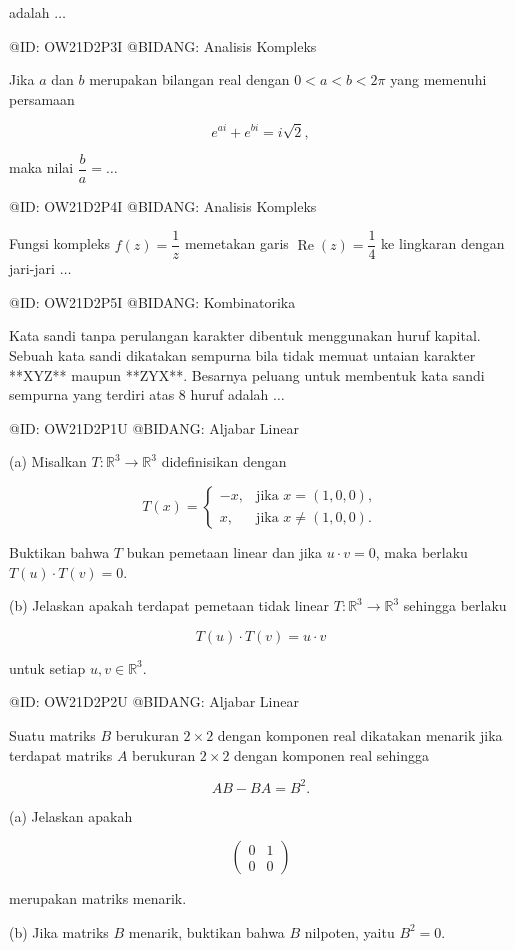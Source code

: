 adalah $\ldots$

@ID: OW21D2P3I
@BIDANG: Analisis Kompleks

Jika $a$ dan $b$ merupakan bilangan real dengan $0<a<b<2\pi$ yang memenuhi persamaan

$$
e^{ai}+e^{bi}=i\sqrt2,
$$

maka nilai $\dfrac ba=\ldots$

@ID: OW21D2P4I
@BIDANG: Analisis Kompleks

Fungsi kompleks $f(z)=\dfrac1z$ memetakan garis $\operatorname{Re}(z)=\dfrac14$ ke lingkaran dengan jari-jari $\ldots$

@ID: OW21D2P5I
@BIDANG: Kombinatorika

Kata sandi tanpa perulangan karakter dibentuk menggunakan huruf kapital. Sebuah kata sandi dikatakan sempurna bila tidak memuat untaian karakter **XYZ** maupun **ZYX**. Besarnya peluang untuk membentuk kata sandi sempurna yang terdiri atas $8$ huruf adalah $\ldots$

@ID: OW21D2P1U
@BIDANG: Aljabar Linear

(a) Misalkan $T:\mathbb R^3\to\mathbb R^3$ didefinisikan dengan

$$
T(x)=
\begin{cases}
-x,&\text{jika }x=(1,0,0),\\
x,&\text{jika }x\ne(1,0,0).
\end{cases}
$$

Buktikan bahwa $T$ bukan pemetaan linear dan jika $u\cdot v=0$, maka berlaku $T(u)\cdot T(v)=0$.

(b) Jelaskan apakah terdapat pemetaan tidak linear $T:\mathbb R^3\to\mathbb R^3$ sehingga berlaku

$$
T(u)\cdot T(v)=u\cdot v
$$

untuk setiap $u,v\in\mathbb R^3$.

@ID: OW21D2P2U
@BIDANG: Aljabar Linear

Suatu matriks $B$ berukuran $2\times2$ dengan komponen real dikatakan menarik jika terdapat matriks $A$ berukuran $2\times2$ dengan komponen real sehingga

$$
AB-BA=B^2.
$$

(a) Jelaskan apakah

$$
\begin{pmatrix}
0&1\\
0&0
\end{pmatrix}
$$

merupakan matriks menarik.

(b) Jika matriks $B$ menarik, buktikan bahwa $B$ nilpoten, yaitu $B^2=0$.


